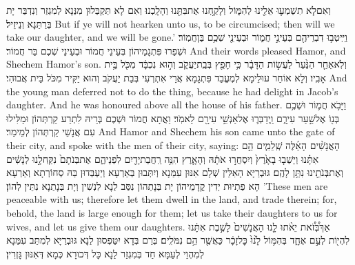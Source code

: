 {וְאִם\maqqaf לֹ֧א תִשְׁמְע֛וּ אֵלֵ֖ינוּ לְהִמּ֑וֹל וְלָקַ֥חְנוּ אֶת\maqqaf בִּתֵּ֖נוּ וְהָלָֽכְנוּ׃}
{וְאִם לָא תְּקַבְּלוּן מִנַּנָא לְמִגְזַר וְנִדְבַּר יָת בְּרַתַּנָא וְנֵיזֵיל׃}
{But if ye will not hearken unto us, to be circumcised; then will we take our daughter, and we will be gone.’}{}
{וַיִּֽיטְב֥וּ דִבְרֵיהֶ֖ם בְּעֵינֵ֣י חֲמ֑וֹר וּבְעֵינֵ֖י שְׁכֶ֥ם בֶּן\maqqaf חֲמֽוֹר׃}
{וּשְׁפַרוּ פִּתְגָמֵיהוֹן בְּעֵינֵי חֲמוֹר וּבְעֵינֵי שְׁכֶם בַּר חֲמוֹר׃}
{And their words pleased Hamor, and Shechem Hamor’s son.}{}
{וְלֹֽא\maqqaf אֵחַ֤ר הַנַּ֙עַר֙ לַעֲשׂ֣וֹת הַדָּבָ֔ר כִּ֥י חָפֵ֖ץ בְּבַֽת\maqqaf יַעֲקֹ֑ב וְה֣וּא נִכְבָּ֔ד מִכֹּ֖ל בֵּ֥ית אָבִֽיו׃}
{וְלָא אוֹחַר עוּלֵימָא לְמֶעֱבַד פִּתְגָמָא אֲרֵי אִתְרְעִי בְּבַת יַעֲקֹב וְהוּא יַקִּיר מִכֹּל בֵּית אֲבוּהִי׃}
{And the young man deferred not to do the thing, because he had delight in Jacob’s daughter. And he was honoured above all the house of his father.}{}
{וַיָּבֹ֥א חֲמ֛וֹר וּשְׁכֶ֥ם בְּנ֖וֹ אֶל\maqqaf שַׁ֣עַר עִירָ֑ם וַֽיְדַבְּר֛וּ אֶל\maqqaf אַנְשֵׁ֥י עִירָ֖ם לֵאמֹֽר׃}
{וַאֲתָא חֲמוֹר וּשְׁכֶם בְּרֵיהּ לִתְרַע קַרְתְּהוֹן וּמַלִּילוּ עִם אֲנָשֵׁי קַרְתְּהוֹן לְמֵימַר׃}
{And Hamor and Shechem his son came unto the gate of their city, and spoke with the men of their city, saying:}{}
{הָאֲנָשִׁ֨ים הָאֵ֜לֶּה שְֽׁלֵמִ֧ים הֵ֣ם אִתָּ֗נוּ וְיֵשְׁב֤וּ בָאָ֙רֶץ֙ וְיִסְחֲר֣וּ אֹתָ֔הּ וְהָאָ֛רֶץ הִנֵּ֥ה רַֽחֲבַת\maqqaf יָדַ֖יִם לִפְנֵיהֶ֑ם אֶת\maqqaf בְּנֹתָם֙ נִקַּֽח\maqqaf לָ֣נוּ לְנָשִׁ֔ים וְאֶת\maqqaf בְּנֹתֵ֖ינוּ נִתֵּ֥ן לָהֶֽם׃}
{גּוּבְרַיָּא הָאִלֵּין שְׁלָם אִנּוּן עִמַּנָא וְיִתְּבוּן בְּאַרְעָא וְיַעְבְּדוּן בַּהּ סְחוֹרְתָא וְאַרְעָא הָא פַתְיוּת יְדִין קֳדָמֵיהוֹן יָת בְּנָתְהוֹן נִסַּב לַנָא לִנְשִׁין וְיָת בְּנָתַנָא נִתֵּין לְהוֹן׃}
{’These men are peaceable with us; therefore let them dwell in the land, and trade therein; for, behold, the land is large enough for them; let us take their daughters to us for wives, and let us give them our daughters.}{}
{אַךְ\maqqaf בְּ֠זֹ֠את יֵאֹ֨תוּ לָ֤נוּ הָאֲנָשִׁים֙ לָשֶׁ֣בֶת אִתָּ֔נוּ לִהְי֖וֹת לְעַ֣ם אֶחָ֑ד בְּהִמּ֥וֹל לָ֙נוּ֙ כׇּל\maqqaf זָכָ֔ר כַּאֲשֶׁ֖ר הֵ֥ם נִמֹּלִֽים׃}
{בְּרַם בְּדָא יִטַּפְסוּן לַנָא גּוּבְרַיָּא לְמִתַּב עִמַּנָא לְמִהְוֵי לְעַמָּא חַד בְּמִגְזַר לַנָא כָּל דְּכוּרָא כְּמָא דְּאִנּוּן גָּזְרִין׃}
